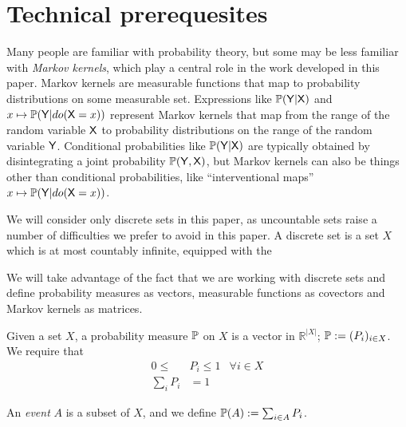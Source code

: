 

\section{Technical prerequesites}

Many people are familiar with probability theory, but some may be less familiar with \emph{Markov kernels}, which play a central role in the work developed in this paper. Markov kernels are measurable functions that map to probability distributions on some measurable set. Expressions like $\mathbb{P}(\mathsf{Y}|\mathsf{X})$ and $x\mapsto \mathbb{P}(\mathsf{Y}|do(\mathsf{X}=x))$ represent Markov kernels that map from the range of the random variable $\mathsf{X}$ to probability distributions on the range of the random variable $\mathsf{Y}$. Conditional probabilities like $\mathbb{P}(\mathsf{Y}|\mathsf{X})$ are typically obtained by disintegrating a joint probability $\mathbb{P}(\mathsf{Y},\mathsf{X})$, but Markov kernels can also be things other than conditional probabilities, like ``interventional maps'' $x\mapsto \mathbb{P}(\mathsf{Y}|do(\mathsf{X}=x))$.

We will consider only discrete sets in this paper, as uncountable sets raise a number of difficulties we prefer to avoid in this paper. A discrete set is a set $X$ which is at most countably infinite, equipped with the 


We will take advantage of the fact that we are working with discrete sets and define probability measures as vectors, measurable functions as covectors and Markov kernels as matrices.

Given a set $X$, a probability measure $\mathbb{P}$ on $X$ is a vector in $\mathbb{R}^{|X|}$; $\mathbb{P}:=(P_i)_{i\in X}$. We require that
\begin{align}
	0\leq &P_i \leq 1 &\forall i\in X\\
	\sum_i P_i &= 1 
\end{align}

An \emph{event} $A$ is a subset of $X$, and we define $\mathbb{P}(A):=\sum_{i\in A} P_i$.

